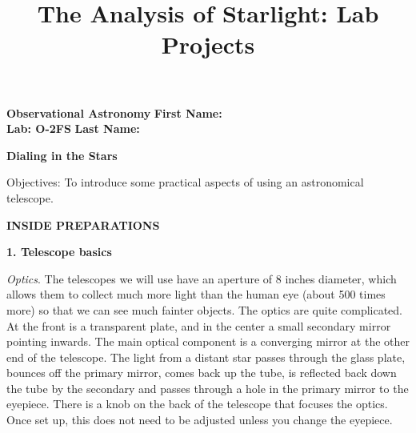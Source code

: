 \documentclass[12pt]{article}
\title{The Analysis of Starlight: Lab Projects}
\begin{document}
\setcounter{page}{1}
\setcounter{equation}{0}
\pagestyle{plain}
\thispagestyle{empty}  %
\newcommand{\kms}{\hbox{km\,s$^{\rm -1}$}}
\def\lo {\ifmmode {\,{\it L}\solar} \else $\,L$\solar\fi}       %
\def\my {\ifmmode {\,{\it M}\solar\,{\rm yr^{-1}}}              %
        \else {$\,M$\solar$\,$yr$^{\rm -1}$}\fi}
\def\BD {BD$\,$+30{\degr}3639}
\def\HUNO{\rm H$\,$I}                   %
\def\HDOS{\rm H$_2$}                    %
\def\arcsec{\ifmmode {^{\scriptscriptstyle\prime\prime}}
          \else $^{\scriptscriptstyle\prime\prime}$\fi}
\def\arcminm{\ifmmode {^{\scriptscriptstyle\prime}}
          \else $^{\scriptscriptstyle\prime}$\fi}
\def\deg{\ifmmode^\circ\else$^\circ$\fi}







\noindent
{\bf Observational Astronomy    \hfill} {\bf First Name:\makebox[4cm]{\hrulefill}}\\
{\bf Lab: O-2FS} \hfill {\bf Last Name:\makebox[4cm]{\hrulefill}}


\bigskip

\medskip

\noindent
{\hfill \Large {\bf Dialing in the Stars} \hfill}


\bigskip

\noindent
{Objectives:} To introduce some practical aspects of using an astronomical telescope.

\bigskip\noindent
{\bf INSIDE PREPARATIONS}


\medskip
\bigskip
\noindent
{\bf 1. Telescope basics}

\medskip
\noindent
\emph{Optics}. The telescopes we will use have an aperture of 8
inches diameter, which allows them to collect much more light than the human
eye (about 500 times more) so that we can see much fainter objects. 
The
optics are quite complicated. At the front is a transparent plate, and
in the center a small secondary mirror pointing inwards. The main
optical component is a converging mirror at the other end of the
telescope. The light from a distant star passes through the glass
plate, bounces off the primary mirror, comes back up the tube, is
reflected back down the tube by the secondary and passes through a hole
in the primary mirror to the eyepiece.  There is a knob on the back of
the telescope that focuses the optics. Once set up, this does not need
to be adjusted unless you change the eyepiece.
\end{document}
